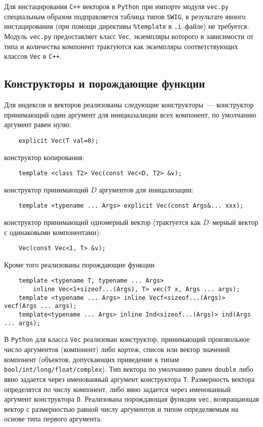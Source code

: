 Для инстацирования {\tt C++} векторов в {\tt Python} при импорте модуля {\tt vec.py} 
специальным образом подправляется таблица типов {\tt SWIG}, в результате явного инстацирования (при помощи директивы 
\verb'%template' в {\tt .i}--файле) не требуется. Модуль {\tt vec.py} предоставляет класс \verb'Vec',
экземпляры которого в зависимости от типа и количества компонент 
трактуются как экземпляры соответствующих классов {\tt Vec} в {\tt C++}.

\subsection{Конструкторы и порождающие функции}
Для индексов и векторов реализованы следующие конструкторы~--- конструктор
принимающий один аргумент для инициазалиции всех компонент, по умолчанию
аргумент равен нулю:
\begin{verbatim}
    explicit Vec(T val=0);
\end{verbatim}
конструктор копирования:
\begin{verbatim}
    template <class T2> Vec(const Vec<D, T2> &v);
\end{verbatim}
конструктор принимающий $D$ аргументов для иницализации:
\begin{verbatim}
    template <typename ... Args> explicit Vec(const Args&... xxx);
\end{verbatim}
конструктор принимающий одномерный вектор (трактуется как $D$--мерный вектор с одинаковыми компонентами):
\begin{verbatim}
    Vec(const Vec<1, T> &v);
\end{verbatim}

Кроме того реализованы порождающие функции
\begin{verbatim}
	template <typename T, typename ... Args> 
        inline Vec<1+sizeof...(Args), T> vec(T x, Args ... args);
	template <typename ... Args> inline Vecf<sizeof...(Args)> vecf(Args ... args);
	template<typename ... Args> inline Ind<sizeof...(Args)> ind(Args ... args);
\end{verbatim}

В  {\tt Python} для класса {\tt Vec} реализован конструктор, принимающий произвольное число аргументов (компонент) 
либо кортеж, список или вектор 
значений компонент (объектов, допускающих приведение к типам {\tt bool/int/long/float/complex}).
Тип вектора по умолчанию равен {\tt double} либо явно задается через именованный аргумент конструктора {\tt T}.
Размерность вектора определятся по числу компонент, либо явно задается через именованный аргумент конструктора {\tt D}.
Реализована порождающая функция {\tt vec}, возвращающая вектор с размерностью равной числу аргументов 
и типом определяемым на основе типа первого аргумента.

